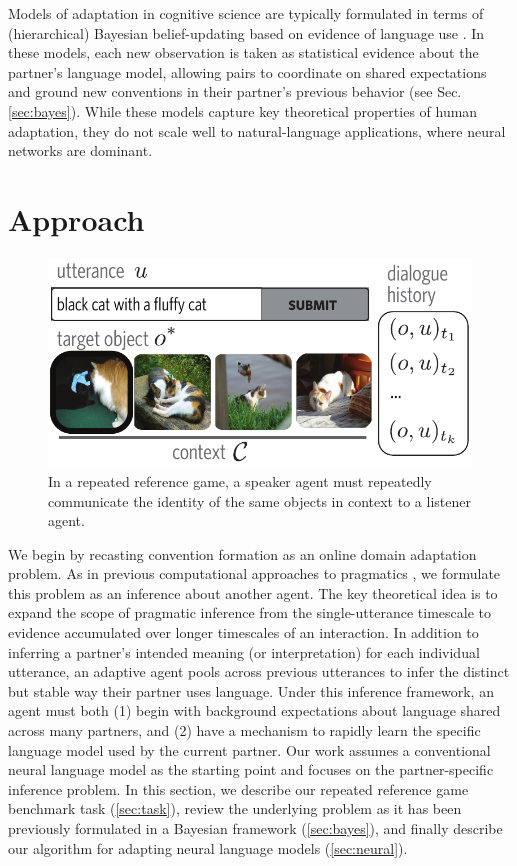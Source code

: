 \documentclass[11pt,a4paper]{article}
\begin{document}
Models of adaptation in cognitive science are typically formulated in terms of (hierarchical) Bayesian belief-updating based on evidence of language use \cite{KleinschmidtJaeger15_RobustSpeechPerception,roettger2019evidential,delaney2019neural,HawkinsFrankGoodman17_ConventionFormation,SchusterDegen}.
In these models, each new observation is taken as statistical evidence about the partner's language model, allowing pairs to coordinate on shared expectations and ground new conventions in their partner's previous behavior (see Sec. \ref{sec:bayes}). 
While these models capture key theoretical properties of human adaptation, they do not scale well to natural-language applications, where neural networks are dominant. 


\section{Approach}
\begin{figure}[t]
\includegraphics[scale=.6]{../figures/ref_game}
\caption{In a repeated reference game, a speaker agent must repeatedly communicate the identity of the same objects in context to a listener agent.}
\label{fig:task}
\end{figure}

\label{sec:approach}
We begin by recasting convention formation as an online domain adaptation problem. 
As in previous computational approaches to pragmatics \cite[e.g.][]{GoodmanFrank16_RSATiCS,andreas2016reasoning}, we formulate this problem as an inference about another agent. 
The key theoretical idea is to expand the scope of pragmatic inference from the single-utterance timescale to evidence accumulated over longer timescales of an interaction. 
In addition to inferring a partner's intended meaning (or interpretation) for each individual utterance, an adaptive agent pools across previous utterances to infer the distinct but stable way their partner uses language.
Under this inference framework, an agent must both (1) begin with background expectations about language shared across many partners, and (2) have a mechanism to rapidly learn the specific language model used by the current partner.
Our work assumes a conventional neural language model as the starting point and focuses on the partner-specific inference problem.
In this section, we describe our repeated reference game benchmark task (\ref{sec:task}), review the underlying problem as it has been previously formulated in a Bayesian framework (\ref{sec:bayes}), and finally describe our algorithm for adapting neural language models (\ref{sec:neural}).
\end{document}
